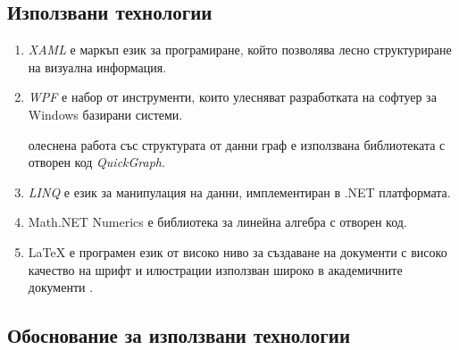 \subsection{Използвани технологии}


\begin{enumerate}
  разработката на приложението е използвана интегрираната среда за разработка на софтуер \textit{Visual Studio 2017}. 
  програмен език е \textit{C Sharp}. 
  визуализацията на примитиви в 3D е използвана библиотеката с отворен код \textit{Helix Toolkit 3D}. Позволява достъп до вече настроен viewport, както и някои базови за работата с 3D обекти функции – ротация, транслация и скалиране.
 
 \item \textit{XAML} е маркъп език за програмиране, който позволява лесно структуриране на визуална информация.
 
 \item \textit{WPF} е набор от инструменти, които улесняват разработката на софтуер за Windows базирани системи.
 
  олеснена работа със структурата от данни граф е използвана библиотеката с отворен код \textit{QuickGraph}. 
 
 \item \textit{LINQ} е език за манипулация на данни, имплементиран в .NET платформата.
 
 \item Math.NET Numerics е библиотека за линейна алгебра с отворен код.
 
 \item LaTeX е програмен език от високо ниво за създаване на документи с високо качество на шрифт и илюстрации използван широко в академичните документи \cite{latexUsage} \cite{latexUsage2}.
\end{enumerate}

\subsection{Обоснование за използвани технологии}


